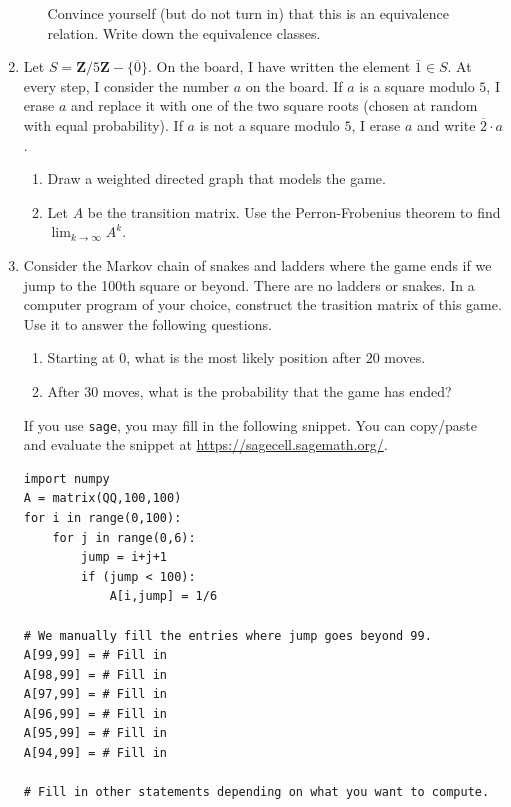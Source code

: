 \documentclass{amsart}
\begin{document}
\begin{enumerate}
\begin{enumerate}
Convince yourself (but do not turn in) that this is an equivalence relation.
Write down the equivalence classes.
\end{enumerate}

\item Let \(S = \mathbf{Z}/5 \mathbf{Z} - \{\overline 0\}\).
On the board, I have written the element \(\overline 1 \in S\).
At every step, I consider the number \(a\) on the board.
If \(a\) is a square modulo \(5\), I erase \(a\) and replace it with one of the two square roots (chosen at random with equal probability).
If \(a\) is not a square modulo \(5\), I erase \(a\) and write \(\overline 2 \cdot a\).

\begin{enumerate}
\item Draw a weighted directed graph that models the game.

\item Let \(A\) be the transition matrix.
Use the Perron-Frobenius theorem to find \(\lim_{k \to \infty} A^k\).
\end{enumerate}

\item Consider the Markov chain of snakes and ladders where the game ends if we jump to the 100th square or beyond.
There are no ladders or snakes.
In a computer program of your choice, construct the trasition matrix of this game.
Use it to answer the following questions.
\begin{enumerate}
\item Starting at 0, what is the most likely position after \(20\) moves.
\item After \(30\) moves, what is the probability that the game has ended?
\end{enumerate}

If you use \texttt{sage}, you may fill in the following snippet.
You can copy/paste and evaluate the snippet at \url{https://sagecell.sagemath.org/}.
\begin{verbatim}
import numpy
A = matrix(QQ,100,100)
for i in range(0,100):
    for j in range(0,6):
        jump = i+j+1
        if (jump < 100):
            A[i,jump] = 1/6

# We manually fill the entries where jump goes beyond 99.
A[99,99] = # Fill in
A[98,99] = # Fill in
A[97,99] = # Fill in
A[96,99] = # Fill in
A[95,99] = # Fill in
A[94,99] = # Fill in

# Fill in other statements depending on what you want to compute.
\end{verbatim}


\end{enumerate}
\end{document}
